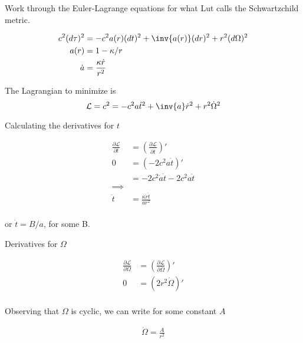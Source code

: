\documentclass{article}      %
\newcommand{\LL}[0]{\mathcal{L}}
\newcommand{\PD}[2]{\frac{\partial {#2}}{\partial {#1}}}
\newcommand{\dotOmega}[0]{\dot{\Omega}}
\newcommand{\CC}[0]{c^2}
\newcommand{\adot}[0]{\dot{a}}
\newcommand{\tdot}[0]{\dot{t}}
\newcommand{\tddot}[0]{\ddot{t}}
\newcommand{\rdot}[0]{\dot{r}}
\begin{document}

%


Work through the Euler-Lagrange equations for what Lut calls the 
Schwartzchild metric.

\begin{align}
\CC (d\tau)^2 &= -\CC a(r) (dt)^2 + \inv{a(r)} (dr)^2 + r^2(d\Omega)^2 \\
a(r) &= 1 - \kappa/r \\
\adot &= \frac{\kappa \rdot}{r^2}
\end{align}

The Lagrangian to minimize is
\begin{equation}
\LL = \CC  = -\CC a \tdot^2 + \inv{a} \rdot^2 + r^2\dotOmega^2
\end{equation}

Calculating the derivatives for $t$

\begin{align*}
\PD{t}{\LL} &= \left(\PD{\tdot}{\LL}\right)' \\
0 
&= \left( - 2 \CC a \tdot \right)' \\
&= - 2 \CC \adot \tdot - 2 \CC a \tddot \\
\implies \\
\tddot &= \frac{\kappa \rdot \tdot}{a r^2} \\
\end{align*}

or $\tdot = B/a$, for some B.

Derivatives for $\Omega$

\begin{align*}
\PD{\Omega}{\LL} &= \left(\PD{\dotOmega}{\LL}\right)' \\
0 &= (2 r^2 \dotOmega)' \\
\end{align*}

Observing that $\Omega$ is cyclic, we can write for some constant $A$

\begin{align*}
\dotOmega = \frac{A}{r^2}
\end{align*}
\end{document}
